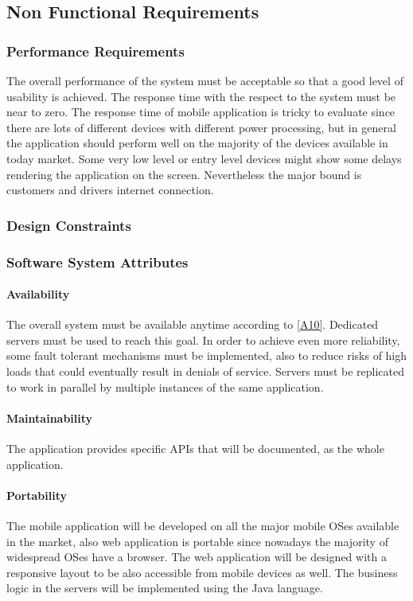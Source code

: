\documentclass[a4paper,12pt]{article}%
\begin{document}
\subsection{Non Functional Requirements}
\subsubsection{Performance Requirements}
The overall performance of the system must be acceptable so that a good level of usability is achieved.
The response time with the respect to the system must be near to zero. The response time of mobile application is tricky to evaluate since there are lots of different devices with different power processing, but  in general the application should perform well on the majority of the devices available in today market. Some very low level or entry level devices might show some delays rendering the application on the screen. Nevertheless the major bound is customers and drivers internet connection. 
\subsubsection{Design Constraints}
\subsubsection{Software System Attributes}
\paragraph{Availability} The overall system must be available anytime according to \hyperref[a10]{[A10]}. Dedicated servers must be used to reach this goal. In order to achieve even more reliability, some fault tolerant mechanisms must be implemented, also to reduce risks of high loads that could eventually result in denials of service. Servers must be replicated to work in parallel by multiple instances of the same application. 
\paragraph{Maintainability} The application provides specific APIs that will be documented, as the whole application.
\paragraph{Portability} The mobile application will be developed on all the major mobile OSes available in the market, also web application is portable since nowadays the majority of widespread OSes have a browser. The web application will be designed with a responsive layout to be also accessible from mobile devices as well. The business logic in the servers will be implemented using the Java language.
\end{document}
